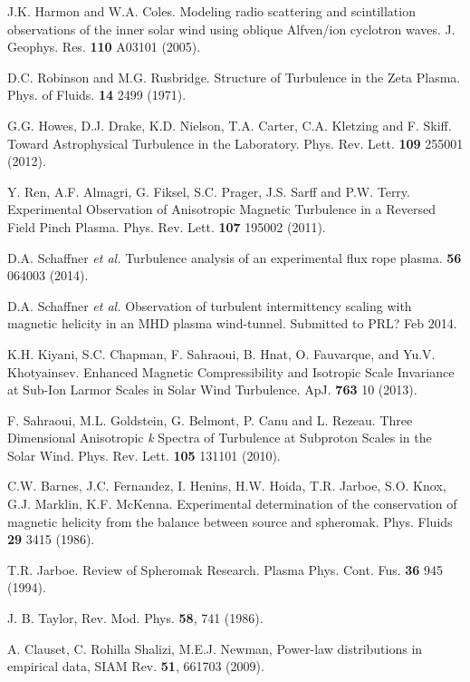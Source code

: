 \documentclass[aip,prl,amsmath,amssymb,reprint,superscriptaddress]{revtex4-1} %
\begin{document}
\begin{thebibliography}{99}
 J.K. Harmon and W.A. Coles. Modeling radio scattering and scintillation observations of the inner solar wind using oblique Alfven/ion cyclotron waves. J. Geophys. Res. {\bf 110} A03101 (2005).

 D.C. Robinson and M.G. Rusbridge. Structure of Turbulence in the Zeta Plasma. Phys. of Fluids. {\bf 14} 2499 (1971).

 G.G. Howes, D.J. Drake, K.D. Nielson, T.A. Carter, C.A. Kletzing and F. Skiff. Toward Astrophysical Turbulence in the Laboratory. Phys. Rev. Lett. {\bf 109} 255001 (2012).

 Y. Ren, A.F. Almagri, G. Fiksel, S.C. Prager, J.S. Sarff and P.W. Terry. Experimental Observation of Anisotropic Magnetic Turbulence in a Reversed Field Pinch Plasma. Phys. Rev. Lett. {\bf 107} 195002 (2011).

 D.A. Schaffner {\it et al.} Turbulence analysis of an experimental flux rope plasma. {\bf 56} 064003 (2014).

 D.A. Schaffner {\it et al.} Observation of turbulent intermittency scaling with magnetic helicity in an MHD plasma wind-tunnel. Submitted to PRL? Feb 2014.

 K.H. Kiyani, S.C. Chapman, F. Sahraoui, B. Hnat, O. Fauvarque, and Yu.V. Khotyainsev. Enhanced Magnetic Compressibility and Isotropic Scale Invariance at Sub-Ion Larmor Scales in Solar Wind Turbulence. ApJ. {\bf 763} 10 (2013).

 F. Sahraoui, M.L. Goldstein, G. Belmont, P. Canu and L. Rezeau. Three Dimensional Anisotropic {\it k} Spectra of Turbulence at Subproton Scales in the Solar Wind. Phys. Rev. Lett. {\bf 105} 131101 (2010).

C.W. Barnes, J.C. Fernandez, I. Henins, H.W. Hoida, T.R. Jarboe, S.O. Knox, G.J. Marklin, K.F. McKenna. Experimental determination of the conservation of magnetic helicity from the balance between source and spheromak. Phys. Fluids {\bf 29} 3415 (1986).

T.R. Jarboe. Review of Spheromak Research. Plasma Phys. Cont. Fus. {\bf 36} 945 (1994).

 J. B. Taylor, Rev. Mod. Phys. {\bf 58}, 741 (1986).

A. Clauset, C. Rohilla Shalizi, M.E.J. Newman, Power-law distributions in empirical data, SIAM Rev. {\bf 51}, 661703 (2009).


\end{thebibliography}
\end{document}
